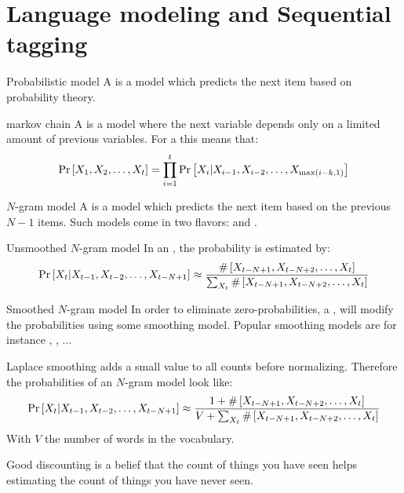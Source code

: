 \section{Language modeling and Sequential tagging}
\begin{df}{Probabilistic model}
A \sb{} is a model which predicts the next item based on probability theory.
\end{df}
\begin{df}{markov chain}
A \sb{} is a model where the next variable depends only on a limited amount of previous variables. For a  this means that:
\begin{equation}
\Pr\left[X_1,X_2,\ldots,X_t\right]=\displaystyle\prod_{i=1}^t{\Pr\left[X_i|X_{i-1},X_{i-2},\ldots,X_{\max\left(i-k,1\right)}\right]}
\end{equation}
\end{df}
\begin{df}{$N$-gram model}
A \sb{} is a model which predicts the next item based on the previous $N-1$ items. Such models come in two flavors:  and .
\end{df}
\begin{df}{Unsmoothed $N$-gram model}
In an \sb{}, the probability is estimated by:
\begin{equation}
\Pr\left[X_t|X_{t-1},X_{t-2},\ldots,X_{t-N+1}\right]\approx\displaystyle\frac{\#\left[X_{t-N+1},X_{t-N+2},\ldots,X_{t}\right]}{\sum_{X_t}\#\left[X_{t-N+1},X_{t-N+2},\ldots,X_{t}\right]}
\end{equation}
\end{df}
\begin{df}{Smoothed $N$-gram model}
In order to eliminate zero-probabilities, a \sb{}, will modify the probabilities using some smoothing model. Popular smoothing models are for instance , , ...
\end{df}
\begin{df}{Laplace smoothing}
\sb{} adds a small value to all counts before normalizing. Therefore the probabilities of an $N$-gram model look like:
\begin{equation}
\Pr\left[X_t|X_{t-1},X_{t-2},\ldots,X_{t-N+1}\right]\approx\displaystyle\frac{1+\#\left[X_{t-N+1},X_{t-N+2},\ldots,X_{t}\right]}{V+\sum_{X_t}\#\left[X_{t-N+1},X_{t-N+2},\ldots,X_{t}\right]}
\end{equation}
With $V$ the number of words in the vocabulary.
\end{df}
\begin{df}{Good discounting}
\sb{} is a belief that the count of things you have seen helps estimating the count of things you have never seen. 
\end{df}

